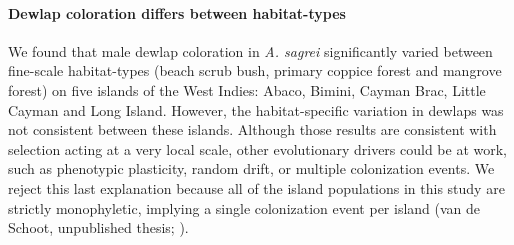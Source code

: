 


\paragraph{Dewlap coloration differs between habitat-types} We found that male dewlap coloration in \textit{A. sagrei} significantly varied between fine-scale habitat-types (beach scrub bush, primary coppice forest and mangrove forest) on five islands of the West Indies: Abaco, Bimini, Cayman Brac, Little Cayman and Long Island. However, the habitat-specific variation in dewlaps was not consistent between these islands. Although those results are consistent with selection acting at a very local scale, other evolutionary drivers could be at work, such as phenotypic plasticity, random drift, or multiple colonization events. We reject this last explanation because all of the island populations in this study are strictly monophyletic, implying a single colonization event per island (van de Schoot, unpublished thesis; \citealt{Driessens2017, Reynolds2020}).

